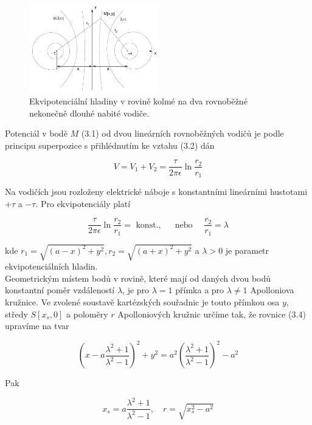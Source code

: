 \documentclass[czech,11pt,a4paper]{article}
\begin{document}
\begin{multicols}{2}
	
	\begin{figure}[H]
		\includegraphics[max width=0.5\textwidth]{2024_10_15_71c3161fc9161f95056eg-1}
		\caption{Ekvipotenciální hladiny v rovině kolmé na dva rovnoběžné nekonečně dlouhé nabité vodiče.}
	\end{figure}
	
	
	Potenciál v bodě $M$ (3.1) od dvou lineárních rovnoběžných vodičů je podle principu superpozice s přihlédnutím ke vztahu (3.2) dán
	
	
	\begin{equation*}
		V=V_{1}+V_{2}=\frac{\tau}{2 \pi \epsilon} \ln \frac{r_{2}}{r_{1}} \tag{3.3}
	\end{equation*}
	
	
	Na vodičích jsou rozloženy elektrické náboje s konstantními lineárními hustotami $+\tau$ a $-\tau$. Pro ekvipotenciály platí
	
	
	\begin{equation*}
		\frac{\tau}{2 \pi \epsilon} \ln \frac{r_{2}}{r_{1}}=\text { konst., } \quad \text { nebo } \quad \frac{r_{2}}{r_{1}}=\lambda \tag{3.4}
	\end{equation*}
	
	
	kde $r_{1}=\sqrt{(a-x)^{2}+y^{2}}, r_{2}=\sqrt{(a+x)^{2}+y^{2}}$ a $\lambda>0$ je parametr ekvipotenciálních hladin.\\
	Geometrickým místem bodů v rovině, které mají od daných dvou bodů konstantní poměr vzdáleností $\lambda$, je pro $\lambda=1$ přímka a pro $\lambda \neq 1$ Apolloniova kružnice. Ve zvolené soustavě kartézských souřadnic je touto přímkou osa $y$, středy $S\left[x_{s}, 0\right]$ a poloměry $r$ Apolloniových kružnic určíme tak, že rovnice (3.4) upravíme na tvar
	
	
	\begin{equation*}
		\left(x-a \frac{\lambda^{2}+1}{\lambda^{2}-1}\right)^{2}+y^{2}=a^{2}\left(\frac{\lambda^{2}+1}{\lambda^{2}-1}\right)^{2}-a^{2} \tag{3.5}
	\end{equation*}
	
	
	Pak
	
	
	\begin{equation*}
		x_{s}=a \frac{\lambda^{2}+1}{\lambda^{2}-1}, \quad r=\sqrt{x_{s}^{2}-a^{2}} \tag{3.6}
	\end{equation*}
	

\end{multicols}
\end{document}
